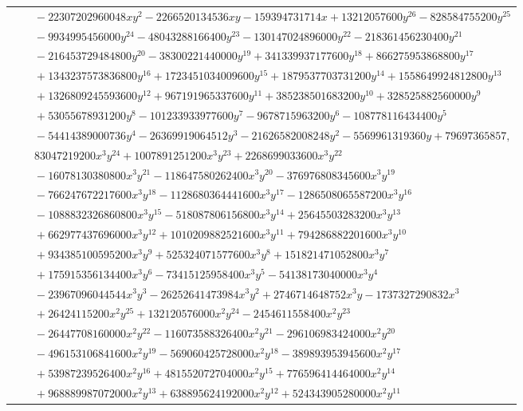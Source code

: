 \documentclass[11pt]{article}
\begin{document}
\begin{longtable}{@{}ll@{}}
 & $\quad -22307202960048xy^{2}-2266520134536xy-159394731714x+13212057600y^{26}-828584755200y^{25}$\\
 & $\quad -9934995456000y^{24}-48043288166400y^{23}-130147024896000y^{22}-218361456230400y^{21}$\\
 & $\quad -216453729484800y^{20}-38300221440000y^{19}+341339937177600y^{18}+866275953868800y^{17}$\\
 & $\quad +1343237573836800y^{16}+1723451034009600y^{15}+1879537703731200y^{14}+1558649924812800y^{13}$\\
 & $\quad +1326809245593600y^{12}+967191965337600y^{11}+385238501683200y^{10}+328525882560000y^{9}$\\
 & $\quad +53055678931200y^{8}-101233933977600y^{7}-9678715963200y^{6}-108778116434400y^{5}$\\
 & $\quad -54414389000736y^{4}-26369919064512y^{3}-21626582008248y^{2}-5569961319360y+79697365857,$\\
 & $\quad 83047219200x^{3}y^{24}+1007891251200x^{3}y^{23}+2268699033600x^{3}y^{22}$\\
 & $\quad -16078130380800x^{3}y^{21}-118647580262400x^{3}y^{20}-376976808345600x^{3}y^{19}$\\
 & $\quad -766247672217600x^{3}y^{18}-1128680364441600x^{3}y^{17}-1286508065587200x^{3}y^{16}$\\
 & $\quad -1088832326860800x^{3}y^{15}-518087806156800x^{3}y^{14}+25645503283200x^{3}y^{13}$\\
 & $\quad +662977437696000x^{3}y^{12}+1010209882521600x^{3}y^{11}+794286882201600x^{3}y^{10}$\\
 & $\quad +934385100595200x^{3}y^{9}+525324071577600x^{3}y^{8}+151821471052800x^{3}y^{7}$\\
 & $\quad +175915356134400x^{3}y^{6}-73415125958400x^{3}y^{5}-54138173040000x^{3}y^{4}$\\
 & $\quad -23967096044544x^{3}y^{3}-26252641473984x^{3}y^{2}+2746714648752x^{3}y-1737327290832x^{3}$\\
 & $\quad +26424115200x^{2}y^{25}+132120576000x^{2}y^{24}-2454611558400x^{2}y^{23}$\\
 & $\quad -26447708160000x^{2}y^{22}-116073588326400x^{2}y^{21}-296106983424000x^{2}y^{20}$\\
 & $\quad -496153106841600x^{2}y^{19}-569060425728000x^{2}y^{18}-389893953945600x^{2}y^{17}$\\
 & $\quad +53987239526400x^{2}y^{16}+481552072704000x^{2}y^{15}+776596414464000x^{2}y^{14}$\\
 & $\quad +968889987072000x^{2}y^{13}+638895624192000x^{2}y^{12}+524343905280000x^{2}y^{11}$\\

\end{longtable}
\end{document}
